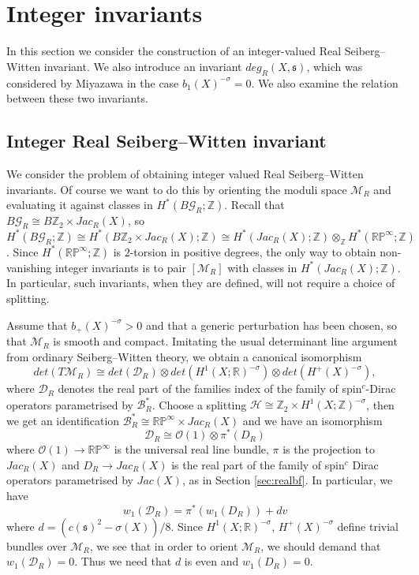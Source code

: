 \documentclass{amsart}
\theoremstyle{definition}
\theoremstyle{remark}
\numberwithin{equation}{section}
\begin{document}
\section{Integer invariants}\label{sec:integral}

In this section we consider the construction of an integer-valued Real Seiberg--Witten invariant. We also introduce an invariant $deg_R(X,\mathfrak{s})$, which was considered by Miyazawa in the case $b_1(X)^{-\sigma} = 0$. We also examine the relation between these two invariants.

\subsection{Integer Real Seiberg--Witten invariant}\label{sec:isw}

We consider the problem of obtaining integer valued Real Seiberg--Witten invariants. Of course we want to do this by orienting the moduli space $\mathcal{M}_R$ and evaluating it against classes in $H^*( B\mathcal{G}_R ; \mathbb{Z})$. Recall that $B \mathcal{G}_R \cong B\mathbb{Z}_2 \times Jac_R(X)$, so $H^*(B\mathcal{G}_R ; \mathbb{Z}) \cong H^*( B \mathbb{Z}_2 \times Jac_R(X) ; \mathbb{Z}) \cong H^*(Jac_R(X) ; \mathbb{Z}) \otimes_{\mathbb{Z}} H^*( \mathbb{RP}^\infty ; \mathbb{Z})$. Since $H^*(\mathbb{RP}^\infty ; \mathbb{Z})$ is $2$-torsion in positive degrees, the only way to obtain non-vanishing integer invariants is to pair $[\mathcal{M}_R]$ with classes in $H^*( Jac_R(X) ; \mathbb{Z})$. In particular, such invariants, when they are defined, will not require a choice of splitting.

Assume that $b_+(X)^{-\sigma} > 0$ and that a generic perturbation has been chosen, so that $\mathcal{M}_R$ is smooth and compact. Imitating the usual determinant line argument from ordinary Seiberg--Witten theory, we obtain a canonical isomorphism
\begin{equation}\label{equ:detTM}
det(T\mathcal{M}_R) \cong det( \mathcal{D}_R ) \otimes det( H^1(X ; \mathbb{R})^{-\sigma} ) \otimes det( H^+(X)^{-\sigma}),
\end{equation}
where $\mathcal{D}_R$ denotes the real part of the families index of the family of spin$^c$-Dirac operators parametrised by $\mathcal{B}_R^*$. Choose a splitting $\mathcal{H} \cong \mathbb{Z}_2 \times H^1(X ; \mathbb{Z})^{-\sigma}$, then we get an identification $\mathcal{B}_R^* \cong \mathbb{RP}^\infty \times Jac_R(X)$ and we have an isomorphism
\[
\mathcal{D}_R \cong \mathcal{O}(1) \otimes \pi^*( D_R)
\]
where $\mathcal{O}(1) \to \mathbb{RP}^\infty$ is the universal real line bundle, $\pi$ is the projection to $Jac_R(X)$ and $D_R \to Jac_R(X)$ is the real part of the family of spin$^c$ Dirac operators parametrised by $Jac(X)$, as in Section \ref{sec:realbf}. In particular, we have
\[
w_1(\mathcal{D}_R) = \pi^*( w_1(D_R) ) + dv
\]
where $d = (c(\mathfrak{s})^2 - \sigma(X) )/8$. Since $H^1(X ; \mathbb{R})^{-\sigma}$, $H^+(X)^{-\sigma}$ define trivial bundles over $\mathcal{M}_R$, we see that in order to orient $\mathcal{M}_R$, we should demand that $w_1(\mathcal{D}_R) = 0$. Thus we need that $d$ is even and $w_1(D_R) = 0$.
\end{document}
